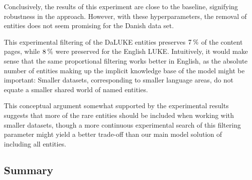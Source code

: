 \documentclass[main.tex]{subfiles}
\begin{document}
Conclusively, the results of this experiment are close to the baseline, signifying robustness in the approach.
However, with these hyperparameters, the removal of entities does not seem promising for the Danish data set.

This experimental filtering of the DaLUKE entities preserves $7\:\text{\%{}}$ of the content pages, while $8\:\text{\%{}}$ were preserved for the English LUKE.
Intuitively, it would make sense that the same proportional filtering works better in English, as the absolute number of entities making up the implicit knowledge base of the model might be important:
Smaller datasets, corresponding to smaller language areas, do not equate a smaller shared world of named entities.

This conceptual argument somewhat supported by the experimental results suggests that more of the rare entities should be included when working with smaller datasets, though a more continuous experimental search of this filtering parameter might yield a better trade-off than our main model solution of including all entities.

\subsection{Summary} \label{subsec:preoverview}
\end{document}
